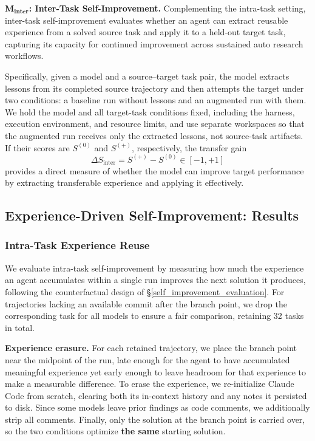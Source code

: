 $\mathbf{M_{inter}}$\textbf{: Inter-Task Self-Improvement.}
Complementing the intra-task setting, inter-task self-improvement evaluates whether an agent can extract reusable experience from a solved source task and apply it to a held-out target task, capturing its capacity for continued improvement across sustained auto research workflows.

Specifically, given a model and a source--target task pair, the model extracts lessons from its completed source trajectory and then attempts the target under two conditions: a baseline run without lessons and an augmented run with them.
We hold the model and all target-task conditions fixed, including the harness, execution environment, and resource limits, and use separate workspaces so that the augmented run receives only the extracted lessons, not source-task artifacts.
If their scores are $S^{(0)}$ and $S^{(+)}$, respectively, the transfer gain
\[
    \Delta S_{\text{inter}} = S^{(+)} - S^{(0)} \in [-1,+1]
\]
provides a direct measure of whether the model can improve target performance by extracting transferable experience and applying it effectively.


\subsection{Experience-Driven Self-Improvement: Results}

\subsubsection{Intra-Task Experience Reuse}
\label{sec:m1_in_task}



We evaluate intra-task self-improvement by measuring how much the experience an agent accumulates within a single run improves the next solution it produces, following the counterfactual design of \S\ref{self_improvement_evaluation}.
For trajectories lacking an available commit after the branch point, we drop the corresponding task for all models to ensure a fair comparison, retaining 32 tasks in total.


 
\textbf{Experience erasure.}
For each retained trajectory, we place the branch point near the midpoint of the run, late enough for the agent to have accumulated meaningful experience yet early enough to leave headroom for that experience to make a measurable difference.
To erase the experience, we re-initialize Claude Code from scratch, clearing both its in-context history and any notes it persisted to disk.
Since some models leave prior findings as code comments, we additionally strip all comments.
Finally, only the solution at the branch point is carried over, so the two conditions optimize \textbf{the same} starting solution.

